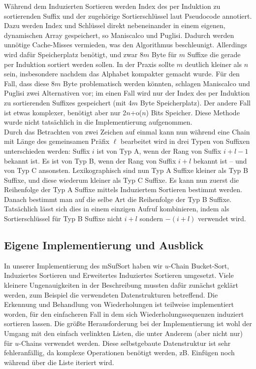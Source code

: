 Während dem Induzierten Sortieren werden Index des per Induktion zu sortierenden Suffix und der zugehörige Sortierschlüssel laut Pseudocode annotiert. Dazu werden Index und Schlüssel direkt nebeneinander in einem eigenen, dynamischen Array gespeichert, so Maniscalco und Puglisi. Dadurch werden unnötige Cache-Misses vermieden, was den Algorithmus beschleunigt. Allerdings wird dafür Speicherplatz benötigt, und zwar 8$m$ Byte für $m$ Suffixe die gerade per Induktion sortiert werden sollen. In der Praxis sollte $m$ deutlich kleiner als $n$ sein, insbesondere nachdem das Alphabet kompakter gemacht wurde.
Für den Fall, dass diese 8$m$ Byte problematisch werden könnten, schlagen Maniscalco und Puglisi zwei Alternativen vor; im einen Fall wird nur der Index des per Induktion zu sortierenden Suffixes gespeichert (mit 4$m$ Byte Speicherplatz). Der andere Fall ist etwas komplexer, benötigt aber nur 2$n$+o($n$) Bits Speicher. Diese Methode wurde nicht tatsächlich in die Implementierung aufgenommen.\\
Durch das Betrachten von zwei Zeichen auf einmal kann nun während eine Chain mit Länge des gemeinsamen Präfix $\ell$ bearbeitet wird in drei Typen von Suffixen unterschieden werden: Suffix $i$ ist von Typ A, wenn der Rang von Suffix $i+l-1$ bekannt ist. Es ist von Typ B, wenn der Rang von Suffix $i+l$ bekannt ist -- und von Typ C ansonsten. Lexikographisch sind nun Typ A Suffixe kleiner als Typ B Suffixe, und diese wiederum kleiner als Typ C Suffixe. Es kann nun zuerst die Reihenfolge der Typ A Suffixe mittels Induziertem Sortieren bestimmt werden. Danach bestimmt man auf die selbe Art die Reihenfolge der Typ B Suffixe. Tatsächlich lässt sich dies in einem einzigen Aufruf kombinieren, indem als Sortierschlüssel für Typ B Suffixe nicht $i+l$ sondern $-(i+l)$ verwendet wird.

\subsection{Eigene Implementierung und Ausblick}
In unserer Implementierung des mSufSort haben wir $u$-Chain Bucket-Sort, Induziertes Sortieren und Erweitertes Induziertes Sortieren umgesetzt. Viele kleinere Ungenauigkeiten in der Beschreibung mussten dafür zunächst geklärt werden, zum Beispiel die verwendeten Datenstrukturen betreffend.
Die Erkennung und Behandlung von Wiederholungen ist teilweise implementiert worden, für den einfacheren Fall in dem sich Wiederholungssequenzen induziert sortieren lassen.
Die größte Herausforderung bei der Implementierung ist wohl der Umgang mit den einfach verlinkten Listen, die unter Anderem (aber nicht nur) für $u$-Chains verwendet werden. Diese selbstgebaute Datenstruktur ist sehr fehleranfällig, da komplexe Operationen benötigt werden, zB. Einfügen noch während über die Liste iteriert wird.\\

